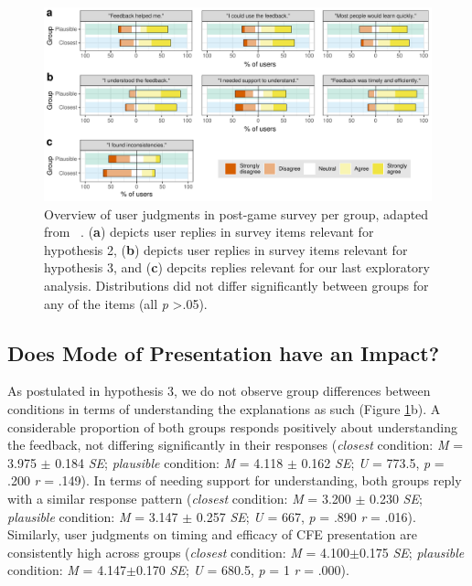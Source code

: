 \begin{figure}
   \centering
   \includegraphics[width=\textwidth]{./media/H2_H3_expl_survey_T_PAZ_FINAL.pdf}
   \caption{Overview of user judgments in post-game survey per group, adapted from ~\citep{holzinger_measuring_2020}. (\textbf{a}) depicts user replies in survey items relevant for hypothesis 2, (\textbf{b}) depicts user replies in survey items relevant for hypothesis 3, and (\textbf{c}) depcits replies relevant for our last exploratory analysis. Distributions did not differ significantly between groups for any of the items (all \textit{p} \textgreater .05).}
   \label{fig:survey}
 \end{figure}

\subsection{Does Mode of Presentation have an Impact?}
As postulated in hypothesis 3, we do not observe group differences between conditions in terms of understanding the explanations as such (Figure \ref{fig:survey}b). 
A considerable proportion of both groups responds positively about understanding the feedback, not differing significantly in their responses (\textit{closest} condition: \textit{M} = 3.975 $\pm$ 0.184 \textit{SE}; \textit{plausible} condition: \textit{M} = 4.118 $\pm$ 0.162 \textit{SE}; \textit{U} = 773.5, \textit{p} = .200 \textit{r} = .149).
In terms of needing support for understanding, both groups reply with a similar response pattern (\textit{closest} condition: \textit{M} = 3.200 $\pm$ 0.230 \textit{SE}; \textit{plausible} condition: \textit{M} = 3.147 $\pm$ 0.257 \textit{SE}; \textit{U} = 667, \textit{p} = .890 \textit{r} = .016).
Similarly, user judgments on timing and efficacy of  CFE presentation are consistently high across groups (\textit{closest} condition: \textit{M} = 4.100$\pm$0.175 \textit{SE}; \textit{plausible} condition: \textit{M} = 4.147$\pm$0.170 \textit{SE}; \textit{U} = 680.5, \textit{p} = 1 \textit{r} = .000).

